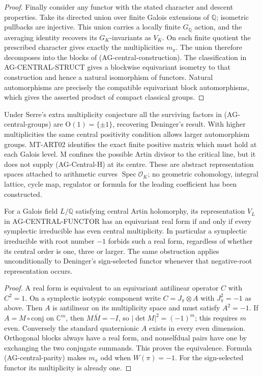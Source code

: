 \begin{proof}
Finally consider any functor with the stated character and
descent properties.  Take its directed union over finite
Galois extensions of $\mathbb Q$; isometric pullbacks are
injective.  This union carries a locally finite $G_{\mathbb Q}$
action, and the averaging identity recovers its $G_K$-invariants
as $V_K$.  On each finite quotient the prescribed character
gives exactly the multiplicities $m_\pi$.  The union therefore
decomposes into the blocks of (AG-central-construction).
The classification in AG-CENTRAL-STRUCT gives a blockwise
equivariant isometry to that construction and hence a natural
isomorphism of functors.  Natural automorphisms are precisely
the compatible equivariant block automorphisms, which gives
the asserted product of compact classical groups.
\end{proof}

Under Serre's extra multiplicity conjecture all the surviving
factors in (AG-central-groups) are $\mathrm O(1)=\{\pm1\}$,
recovering Deninger's result.  With higher multiplicities the
same central positivity condition allows larger automorphism
groups.  MT-ART02 identifies the exact finite positive matrix
which must hold at each Galois level.  M confines the possible
Artin divisor to the critical line, but it does not supply
(AG-Central-H) at its centre.  These are abstract representation
spaces attached to arithmetic curves $\operatorname{Spec}\mathcal O_K$;
no geometric cohomology, integral lattice, cycle map, regulator
or formula for the leading coefficient has been constructed.

\begin{proposition}
For a Galois field $L/\mathbb Q$ satisfying central Artin
holomorphy, its representation $V_L$ in AG-CENTRAL-FUNCTOR
has an equivariant real form if and only if every symplectic
irreducible has even central multiplicity.  In particular a
symplectic irreducible with root number $-1$ forbids such a
real form, regardless of whether its central order is one,
three or larger.  The same obstruction applies unconditionally
to Deninger's sign-selected functor whenever that negative-root
representation occurs.
\end{proposition}
\begin{proof}
A real form is equivalent to an equivariant antilinear operator
$C$ with $C^2=1$.  On a symplectic isotypic component write
$C=J_\pi\otimes A$ with $J_\pi^2=-1$ as above.  Then $A$
is antilinear on its multiplicity space and must satisfy
$A^2=-1$.  If $A=M\circ\mathrm{conj}$ on $\mathbb C^m$,
then $M\bar M=-I$, so
$|\det M|^2=(-1)^m$; this requires $m$ even.
Conversely the standard quaternionic $A$ exists in every even
dimension.  Orthogonal blocks always have a real form, and
nonselfdual pairs have one by exchanging the two conjugate
summands.  This proves the equivalence.  Formula
(AG-central-parity) makes $m_\pi$ odd when $W(\pi)=-1$.
For the sign-selected functor its multiplicity is already one.
\end{proof}

